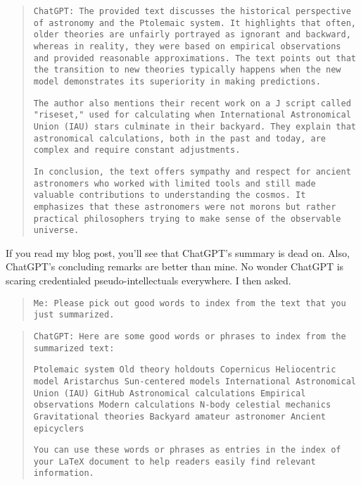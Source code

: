 \begin{quote}
\texttt{ChatGPT: The provided text discusses the historical perspective
of astronomy and the Ptolemaic system. It highlights that often, older
theories are unfairly portrayed as ignorant and backward, whereas in
reality, they were based on empirical observations and provided
reasonable approximations. The text points out that the transition to
new theories typically happens when the new model demonstrates its
superiority in making predictions.}

\texttt{The author also mentions their recent work on a J script called
"riseset," used for calculating when International Astronomical Union
(IAU) stars culminate in their backyard. They explain that astronomical
calculations, both in the past and today, are complex and require
constant adjustments.}

\texttt{In conclusion, the text offers sympathy and respect for ancient
astronomers who worked with limited tools and still made valuable
contributions to understanding the cosmos. It emphasizes that these
astronomers were not morons but rather practical philosophers trying to
make sense of the observable universe.}
\end{quote}

If you read my blog post, you'll see that ChatGPT's summary is dead on.
Also, ChatGPT's concluding remarks are better than mine. No wonder
ChatGPT is scaring credentialed pseudo-intellectuals everywhere. I then
asked.

\begin{quote}
\texttt{Me: Please pick out good words to index from the text that you
just summarized.}
\end{quote}

\begin{quote}
\texttt{ChatGPT: Here are some good words or phrases to index from the
summarized text:}

\texttt{Ptolemaic system\newline
Old theory holdouts\newline
Copernicus\newline
Heliocentric model\newline
Aristarchus\newline
Sun-centered models\newline
International Astronomical Union (IAU)\newline
GitHub\newline
Astronomical calculations\newline
Empirical observations\newline
Modern calculations\newline
N-body celestial mechanics\newline
Gravitational theories\newline
Backyard amateur astronomer\newline
Ancient epicyclers\newline}

\texttt{You can use these words or phrases as entries in the index of your LaTeX
document to help readers easily find relevant information.}
\end{quote}

